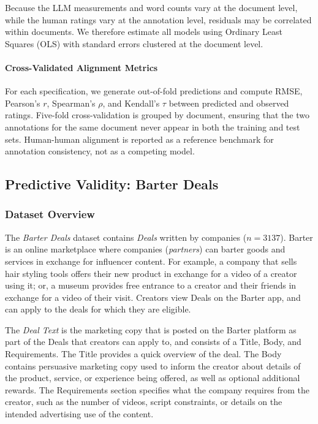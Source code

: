 Because the LLM measurements and word counts vary at the document level, while the human ratings vary at the annotation level, residuals may be correlated within documents. We therefore estimate all models using Ordinary Least Squares (OLS) with standard errors clustered at the document level.

\paragraph{Cross-Validated Alignment Metrics}

For each specification, we generate out-of-fold predictions and compute RMSE, Pearson's $r$, Spearman's $\rho$, and Kendall's $\tau$ between predicted and observed ratings. Five-fold cross-validation is grouped by document, ensuring that the two annotations for the same document never appear in both the training and test sets. Human-human alignment is reported as a reference benchmark for annotation consistency, not as a competing model.



\subsection{Predictive Validity: Barter Deals}\label{sec:methods_barter}

\subsubsection{Dataset Overview}

The \textit{Barter Deals} dataset contains \textit{Deals} written by companies ($n=3137$). Barter is an online marketplace where companies (\textit{partners}) can barter goods and services in exchange for influencer content. For example, a company that sells hair styling tools offers their new product in exchange for a video of a creator using it; or, a museum provides free entrance to a creator and their friends in exchange for a video of their visit. Creators view Deals on the Barter app, and can apply to the deals for which they are eligible. 

The \textit{Deal Text} is the marketing copy that is posted on the Barter platform as part of the Deals that creators can apply to, and consists of a Title, Body, and Requirements. The Title provides a quick overview of the deal. The Body contains persuasive marketing copy used to inform the creator about details of the product, service, or experience being offered, as well as optional additional rewards. The Requirements section specifies what the company requires from the creator, such as the number of videos, script constraints, or details on the intended advertising use of the content.

